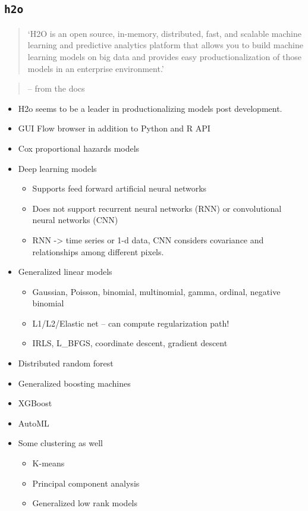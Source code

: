 \documentclass[fontset=fandol,zihao=false,scheme=chinese,heading=true,UTF8]{ctexbook}
\providecommand{\tightlist}{%
  \setlength{\itemsep}{0pt}\setlength{\parskip}{0pt}}
\begin{document}
\hypertarget{h2o}{%
\subsection{\texorpdfstring{\texttt{h2o}}{h2o}}\label{h2o}}

\begin{quote}
`H2O is an open source, in-memory, distributed, fast, and scalable machine learning and predictive analytics platform that allows you to build machine learning models on big data and provides easy productionalization of those models in an enterprise environment.'
\end{quote}

\begin{quote}
-- from the docs
\end{quote}

\begin{itemize}
\item
  H2o seems to be a leader in productionalizing models post development.
\item
  GUI Flow browser in addition to Python and R API
\item
  Cox proportional hazards models
\item
  Deep learning models

  \begin{itemize}
  \tightlist
  \item
    Supports feed forward artificial neural networks
  \item
    Does not support recurrent neural networks (RNN) or convolutional neural networks (CNN)
  \item
    RNN -\textgreater{} time series or 1-d data, CNN considers covariance and relationships among different pixels.
  \end{itemize}
\item
  Generalized linear models

  \begin{itemize}
  \tightlist
  \item
    Gaussian, Poisson, binomial, multinomial, gamma, ordinal, negative binomial
  \item
    L1/L2/Elastic net -- can compute regularization path!
  \item
    IRLS, L\_BFGS, coordinate descent, gradient descent
  \end{itemize}
\item
  Distributed random forest
\item
  Generalized boosting machines
\item
  XGBoost
\item
  AutoML
\item
  Some clustering as well

  \begin{itemize}
  \tightlist
  \item
    K-means
  \item
    Principal component analysis
  \item
    Generalized low rank models
  \end{itemize}
\end{itemize}
\end{document}
